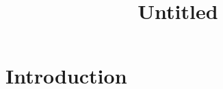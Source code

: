 \documentclass[11pt]{article}
\title{Untitled}
\author{}
\begin{document}
\maketitle

\begin{abstract}
\end{abstract}

\section{Introduction}



\end{document}
